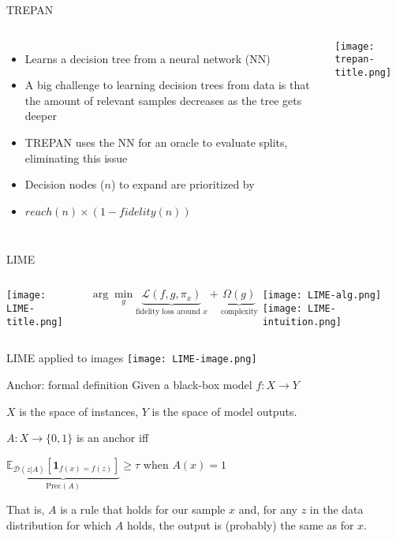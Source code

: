 \documentclass[aspectratio=169]{beamer}
\begin{document}
\begin{frame}{TREPAN} %
\begin{columns}
	\begin{itemize}[<+->]
		\item Learns a decision tree from a neural network (NN)
		\item A big challenge to learning decision trees from data is that the amount of relevant samples decreases as the tree gets deeper
		\item TREPAN uses the NN for an oracle to evaluate splits, eliminating this issue
		\item Decision nodes ($n$) to expand are prioritized by
		\item[] $\mathit{reach}( n ) \times (1 - \mathit{fidelity}(n) )$
	\end{itemize}
	\column{6cm}
	\texttt{[image: trepan-title.png]}
\end{columns}
\end{frame}


\begin{frame}{LIME}
\begin{columns}
	 \centering
	\texttt{[image: LIME-title.png]}
	
	{\color{UWRed}
	\[
	\arg \min_g \underbrace{ \mathcal L ( f, g, \pi_x ) }_{\text{fidelity loss around }x} + \underbrace{ \Omega( g ) }_\text{complexity}
	\]}
	
	\texttt{[image: LIME-alg.png]}
	 \centering
	\texttt{[image: LIME-intuition.png]}
\end{columns}
\end{frame}


\begin{frame}{LIME applied to images}
\texttt{[image: LIME-image.png]}
\end{frame}





\begin{frame}{Anchor: formal definition}
  Given a black-box model $f : X \rightarrow Y$
  
  $X$ is the space of instances, $Y$ is the space of model outputs.
  
  $A : X \rightarrow \{0,1\}$ is an anchor iff
  
  $\underbrace{\mathbb{E}_{\mathcal D (z | A)} \left[ \mathbf{1}_{f(x)=f(z)} \right] }_{\mathrm{Prec}(A)} \geq \tau$ when $A(x) = 1$
  
  That is, $A$ is a rule that holds for our sample $x$ and, for any $z$ in the data distribution for which $A$ holds, the output is (probably) the same as for $x$.
\end{frame}
\end{document}
